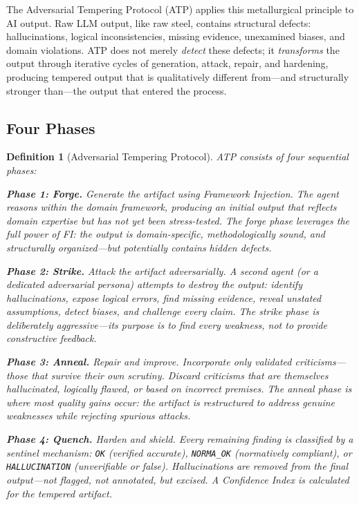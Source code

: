 \documentclass[12pt,a4paper]{article}
\newtheorem{definition}{Definition}[section]
\begin{document}
The Adversarial Tempering Protocol (ATP) applies this metallurgical principle to AI output. Raw LLM output, like raw steel, contains structural defects: hallucinations, logical inconsistencies, missing evidence, unexamined biases, and domain violations. ATP does not merely \emph{detect} these defects; it \emph{transforms} the output through iterative cycles of generation, attack, repair, and hardening, producing tempered output that is qualitatively different from---and structurally stronger than---the output that entered the process.

\subsection{Four Phases}

\begin{definition}[Adversarial Tempering Protocol]
ATP consists of four sequential phases:

\textbf{Phase 1: Forge.} Generate the artifact using Framework Injection. The agent reasons within the domain framework, producing an initial output that reflects domain expertise but has not yet been stress-tested. The forge phase leverages the full power of FI: the output is domain-specific, methodologically sound, and structurally organized---but potentially contains hidden defects.

\textbf{Phase 2: Strike.} Attack the artifact adversarially. A second agent (or a dedicated adversarial persona) attempts to \emph{destroy} the output: identify hallucinations, expose logical errors, find missing evidence, reveal unstated assumptions, detect biases, and challenge every claim. The strike phase is deliberately aggressive---its purpose is to find every weakness, not to provide constructive feedback.

\textbf{Phase 3: Anneal.} Repair and improve. Incorporate \emph{only validated criticisms}---those that survive their own scrutiny. Discard criticisms that are themselves hallucinated, logically flawed, or based on incorrect premises. The anneal phase is where most quality gains occur: the artifact is restructured to address genuine weaknesses while rejecting spurious attacks.

\textbf{Phase 4: Quench.} Harden and shield. Every remaining finding is classified by a sentinel mechanism: \texttt{OK} (verified accurate), \texttt{NORMA\_OK} (normatively compliant), or \texttt{HALLUCINATION} (unverifiable or false). Hallucinations are \emph{removed} from the final output---not flagged, not annotated, but excised. A Confidence Index is calculated for the tempered artifact.
\end{definition}
\end{document}
